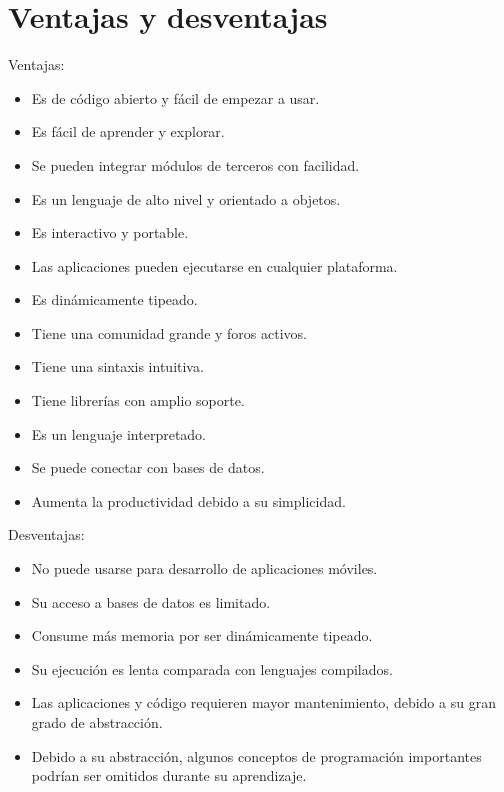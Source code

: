 \section{Ventajas y desventajas}

Ventajas:

\begin{itemize}
  \item Es de código abierto y fácil de empezar a usar.
  
  \item Es fácil de aprender y explorar.
  
  \item Se pueden integrar módulos de terceros con facilidad.
  
  \item Es un lenguaje de alto nivel y orientado a objetos.
  
  \item Es interactivo y portable.
  
  \item Las aplicaciones pueden ejecutarse en cualquier plataforma.
  
  \item Es dinámicamente tipeado.
  
  \item Tiene una comunidad grande y foros activos.
  
  \item Tiene una sintaxis intuitiva.
  
  \item Tiene librerías con amplio soporte.
  
  \item Es un lenguaje interpretado.
  
  \item Se puede conectar con bases de datos.
  
  \item Aumenta la productividad debido a su simplicidad.
  
\end{itemize}

Desventajas:

\begin{itemize}
  \item No puede usarse para desarrollo de aplicaciones móviles.
  
  \item Su acceso a bases de datos es limitado.
  
  \item Consume más memoria por ser dinámicamente tipeado.
  
  \item Su ejecución es lenta comparada con lenguajes compilados.
  
  \item Las aplicaciones y código requieren mayor mantenimiento, debido a su gran grado de abstracción.

  \item Debido a su abstracción, algunos conceptos de programación importantes podrían ser omitidos durante su aprendizaje.

\end{itemize}

